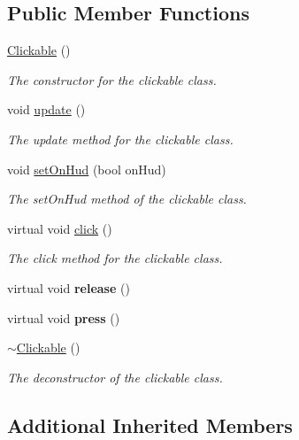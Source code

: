 \subsection*{Public Member Functions}
\begin{DoxyCompactItemize}
\item 
\hyperlink{class_clickable_a526e0a8373f069f85db6d0d8fc4ec655}{Clickable} ()
\begin{DoxyCompactList}\small\item\em The constructor for the clickable class. \end{DoxyCompactList}\item 
void \hyperlink{class_clickable_a57d5d78289d710b078ddfe61000f0dbd}{update} ()
\begin{DoxyCompactList}\small\item\em The update method for the clickable class. \end{DoxyCompactList}\item 
void \hyperlink{class_clickable_a28eaa099f0a3230d7a140a1690b64036}{set\+On\+Hud} (bool on\+Hud)
\begin{DoxyCompactList}\small\item\em The set\+On\+Hud method of the clickable class. \end{DoxyCompactList}\item 
virtual void \hyperlink{class_clickable_a1f99a456a892196f3fa9b6e380e7ac7a}{click} ()
\begin{DoxyCompactList}\small\item\em The click method for the clickable class. \end{DoxyCompactList}\item 
\hypertarget{class_clickable_a385ffbb3aae2b3528e183440b7ac37dc}{virtual void {\bfseries release} ()}\label{class_clickable_a385ffbb3aae2b3528e183440b7ac37dc}

\item 
\hypertarget{class_clickable_a0bfd41ac944b05899a34a5ab3ed531c4}{virtual void {\bfseries press} ()}\label{class_clickable_a0bfd41ac944b05899a34a5ab3ed531c4}

\item 
\hyperlink{class_clickable_ac534e76857fc4ff6dc079b0185ee076c}{$\sim$\+Clickable} ()
\begin{DoxyCompactList}\small\item\em The deconstructor of the clickable class. \end{DoxyCompactList}\end{DoxyCompactItemize}
\subsection*{Additional Inherited Members}


